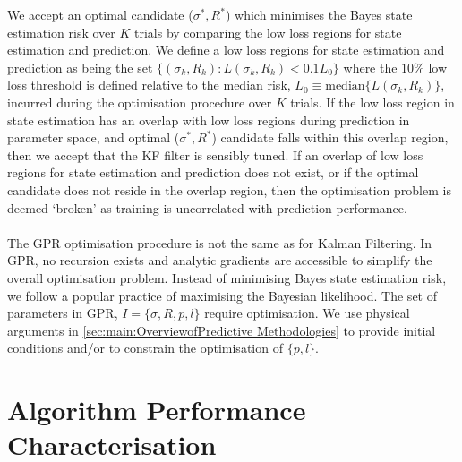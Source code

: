 We accept an optimal candidate ($\sigma^*, R^*$) which minimises the Bayes state estimation risk over $K$ trials by comparing the low loss regions for state estimation and prediction. We define a low loss regions for state estimation and prediction as being the set $ \{ (\sigma_k, R_k) : L(\sigma_k, R_k) < 0.1 L_0 \}$ where the $10 \%$ low loss threshold is defined relative to the median risk, $L_0 \equiv \text{median}\{  L(\sigma_k, R_k) \}$, incurred during the optimisation procedure over $K$ trials. If the low loss region in state estimation has an overlap with low loss regions during prediction in parameter space, and optimal ($\sigma^*, R^*$) candidate falls within this overlap region, then we accept that the KF filter is sensibly tuned. If an overlap of low loss regions for state estimation and prediction does not exist, or if the optimal candidate does not reside in the overlap region, then the optimisation problem is deemed `broken' as training is uncorrelated with prediction performance. 
\\
\\
The GPR optimisation procedure is not the same as for Kalman Filtering. In GPR, no recursion exists and analytic gradients are accessible to simplify the overall optimisation problem. Instead of minimising Bayes state estimation risk, we follow a popular practice of maximising the Bayesian likelihood. The set of parameters in GPR, $I = \{\sigma, R, p, l \}$ require optimisation. We use physical arguments in \cref{sec:main:OverviewofPredictive Methodologies} to provide initial conditions and/or to constrain the optimisation of $\{ p, l\}$. 

\section{Algorithm Performance Characterisation \label{sec:main:Performance}}

